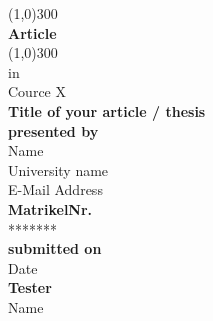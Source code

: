 	\begin{titlepage}

		\begin{center}
		\line(1,0){300} \\
		[2mm]
		\huge{\bfseries Article} \\
		\line(1,0){300} \\
		[1cm]

		\large{in \\ Cource X} \\
		[1cm]
		\LARGE{\textbf{Title of your article / thesis}} \\
		[1.5cm]

		\large{\textbf {presented by} \\ Name \\ 
		University name \\
		E-Mail Address} \\
		[0.5cm]
		\large{\textbf{MatrikelNr.} \\ *******} \\
		[0.5cm]
		\large{\textbf{submitted on} \\ Date} \\
		[0.5cm]
		\large{\textbf{Tester} \\ Name} \\ 

	\end{center}
\end{titlepage}
